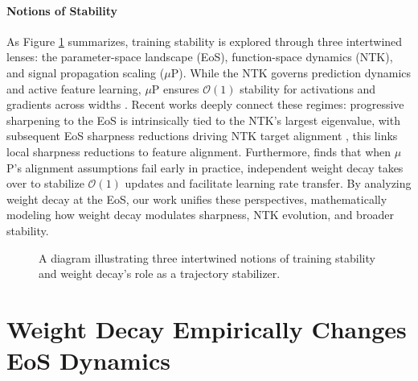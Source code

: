 \documentclass{article}
\begin{document}
\paragraph{Notions of Stability}
As Figure \ref{fig:big_picture_story} summarizes, training stability is explored through three intertwined lenses: the parameter-space landscape (EoS), function-space dynamics (NTK), and signal propagation scaling ($\mu$P). While the NTK \citep{ntk} governs prediction dynamics and active feature learning, $\mu$P ensures $\mathcal{O}(1)$ stability for activations and gradients across widths \citep{mup}. Recent works deeply connect these regimes: progressive sharpening to the EoS is intrinsically tied to the NTK's largest eigenvalue, with subsequent EoS sharpness reductions driving NTK target alignment \citep{noci, ntk_eos, lauditi2026spectral}, this links local sharpness reductions to feature alignment. Furthermore, \citep{wdmup} finds that when $\mu$P's alignment assumptions fail early in practice, independent weight decay takes over to stabilize $\mathcal{O}(1)$ updates and facilitate learning rate transfer. By analyzing weight decay at the EoS, our work unifies these perspectives, mathematically modeling how weight decay modulates sharpness, NTK evolution, and broader stability.
\begin{figure}[htbp]
\centering
{}
\caption{A diagram illustrating three intertwined notions of training stability and weight decay's role as a trajectory stabilizer.}
\label{fig:big_picture_story}
\end{figure}


\section{Weight Decay Empirically Changes EoS Dynamics}
\label{sec:empirical}
\end{document}
